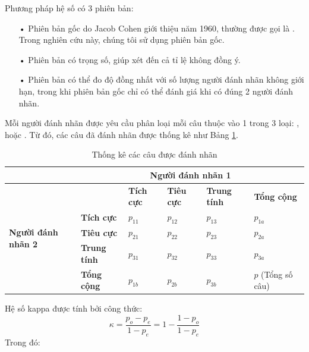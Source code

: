 Phương pháp hệ số  có 3 phiên bản:
\begin{itemize}
\item[•] Phiên bản gốc do Jacob Cohen giới thiệu năm 1960, thường được gọi là . Trong nghiên cứu này, chúng tôi sử dụng phiên bản gốc.
\item[•] Phiên bản  có trọng số, giúp xét đến cả tỉ lệ không đồng ý.
\item[•] Phiên bản  có thể đo độ đồng nhất với số lượng người đánh nhãn không giới hạn, trong khi phiên bản gốc chỉ có thể đánh giá khi có đúng 2 người đánh nhãn.
\end{itemize}
Mỗi người đánh nhãn được yêu cầu phân loại mỗi câu thuộc vào 1 trong 3 loại: \tichcuc, \tieucuc hoặc \trungtinh. Từ đó, các câu đã đánh nhãn được thống kê như Bảng \ref{table:kappa}.
\begin{table}[H]
\caption{Thống kê các câu được đánh nhãn} \label{table:kappa}
\begin{tabular}{|m{2cm}|l|l|l|l|l|}
\hline
	& \multicolumn{5}{c|}{\textbf{Người đánh nhãn 1}}                                                                \\ \hline
\multirow{5}{2cm}{\textbf{Người đánh nhãn 2}} & \textbf{}           & \textbf{Tích cực} & \textbf{Tiêu cực} & \textbf{Trung tính} & \textbf{Tổng cộng}         \\ \cline{2-6} 
                                            & \textbf{Tích cực}   & $p_{11}$          & $p_{12}$          & $p_{13}$            & $p_{1a}$                      \\ \cline{2-6} 
                                            & \textbf{Tiêu cực}   & $p_{21}$          & $p_{22}$          & $p_{23}$            & $p_{2a}$                      \\ \cline{2-6} 
                                            & \textbf{Trung tính} & $p_{31}$          & $p_{32}$          & $p_{33}$            & $p_{3a}$                      \\ \cline{2-6} 
                                            & \textbf{Tổng cộng}  & $p_{1b}$             & $p_{2b}$             & $p_{3b}$               & $p$ (Tổng số câu) \\ \hline
\end{tabular}
\end{table}
Hệ số kappa được tính bởi công thức:
$$\kappa = \dfrac{p_o - p_e}{1 - p_e} = 1 - \dfrac{1-p_o}{1-p_e}$$
Trong đó:
